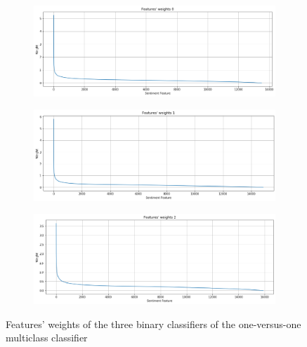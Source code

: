 \begin{figure}[H]
	\centering
	\begin{subfigure}{1\textwidth} %
		\includegraphics[width=\textwidth]{figures/conf_matrices/twitter_sent_svm/svm_fs_1.png}
	\end{subfigure}
	\begin{subfigure}{1\textwidth} %
		\includegraphics[width=\textwidth]{figures/conf_matrices/twitter_sent_svm/svm_fs_2.png}
	\end{subfigure}
	\begin{subfigure}{1\textwidth} %
	\includegraphics[width=\textwidth]{figures/conf_matrices/twitter_sent_svm/svm_fs_3.png}
	\end{subfigure}
	\caption{Features' weights of the three binary classifiers of the one-versus-one multiclass classifier} %
	\label{fig:svm-fs}
\end{figure}

